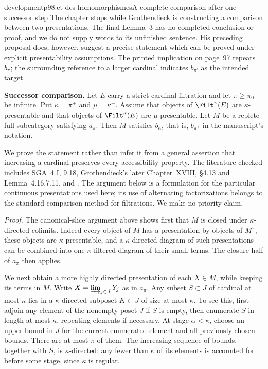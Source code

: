 \begin{dcomment}{development}{p98:et des homomorphismes}{A complete comparison after one successor step}
The chapter stops while Grothendieck is constructing a comparison between two presentations. The final Lemma~3 has no completed conclusion or proof, and we do not supply words to its unfinished sentence. His preceding proposal does, however, suggest a precise statement which can be proved under explicit presentability assumptions. The printed implication on page~97 repeats $b_\pi$; the surrounding reference to a larger cardinal indicates $b_{\pi'}$ as the intended target.

\textbf{Successor comparison.}\ours
Let $E$ carry a strict cardinal filtration and let $\pi\geq\pi_0$ be infinite. Put $\kappa=\pi^+$ and $\mu=\kappa^+$. Assume that objects of $\Filt^\pi(E)$ are $\kappa$-presentable and that objects of $\Filt^\kappa(E)$ are $\mu$-presentable. Let $M$ be a replete full subcategory satisfying $a_\pi$. Then $M$ satisfies $b_\kappa$, that is, $b_{\pi^+}$ in the manuscript's notation.

We prove the statement rather than infer it from a general assertion that increasing a cardinal preserves every accessibility property. The literature checked includes SGA~4 I, 9.18, Grothendieck's later Chapter~XVIII, \S4.13 and Lemma~4.16.7.11, and \citet[\S8]{LiebermanRosickyVasey2020}. The argument below is a formulation for the particular continuous presentations used here; its use of alternating factorizations belongs to the standard comparison method for filtrations. We make no priority claim.

\emph{Proof.} The canonical-slice argument above shows first that $M$ is closed under $\kappa$-directed colimits. Indeed every object of $M$ has a presentation by objects of $M^\pi$, these objects are $\kappa$-presentable, and a $\kappa$-directed diagram of such presentations can be combined into one $\kappa$-filtered diagram of their small terms. The closure half of $a_\pi$ then applies.

We next obtain a more highly directed presentation of each $X\in M$, while keeping its terms in $M$. Write $X=\varinjlim_{j\in J}Y_j$ as in $a_\pi$. Any subset $S\subset J$ of cardinal at most $\kappa$ lies in a $\kappa$-directed subposet $K\subset J$ of size at most $\kappa$. To see this, first adjoin any element of the nonempty poset $J$ if $S$ is empty, then enumerate $S$ in length at most $\kappa$, repeating elements if necessary. At stage $\alpha<\kappa$, choose an upper bound in $J$ for the current enumerated element and all previously chosen bounds. There are at most $\pi$ of them. The increasing sequence of bounds, together with $S$, is $\kappa$-directed: any fewer than $\kappa$ of its elements is accounted for before some stage, since $\kappa$ is regular.


\end{dcomment}
